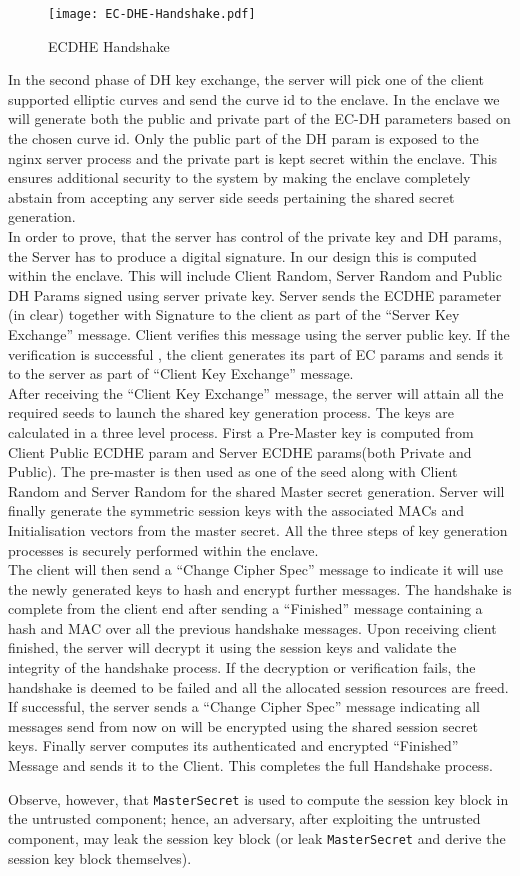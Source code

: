 \documentclass[../../main.tex]{subfiles}
\begin{document}
\begin{figure}[H]
  \centering
  \texttt{[image: EC-DHE-Handshake.pdf]}
  \caption{ECDHE Handshake}
  \label{fig:ecdhe_handshake}
\end{figure}

\noindent
In the second phase of DH key exchange, the server will pick one of
the client supported elliptic curves and send the curve id to the
enclave. In the enclave we will generate both the public and private
part of the EC-DH parameters based on the chosen curve id. Only the
public part of the DH param is exposed to the nginx server process and
the private part is kept secret within the enclave. This ensures
additional security to the system by making the enclave completely
abstain from accepting any server side seeds pertaining the shared
secret generation.\\

\noindent
In order to prove, that the server has control of the private key and
DH params, the Server has to produce a digital signature. In our
design this is computed within the enclave. This will include Client
Random, Server Random and Public DH Params signed using server private
key. Server sends the ECDHE parameter (in clear) together with
Signature to the client as part of the “Server Key Exchange” message.
Client verifies this message using the server public key. If the
verification is successful , the client generates its part of EC
params and sends it to the server as part of “Client Key Exchange”
message.\\

\noindent
After receiving the “Client Key Exchange” message, the server will
attain all the required seeds to launch the shared key generation
process. The keys are calculated in a three level process. First a
Pre-Master key is computed from Client Public ECDHE param and Server
ECDHE params(both Private and Public). The pre-master is then used as
one of the seed along with Client Random and Server Random for the
shared Master secret generation. Server will finally generate the
symmetric session keys with the associated MACs and Initialisation
vectors from the master secret. All the three steps of key
generation processes is securely performed within the enclave.\\

\noindent
The client will then send a “Change Cipher Spec” message to indicate
it will use the newly generated keys to hash and encrypt further
messages. The handshake is complete from the client end after sending
a “Finished” message containing a hash and MAC over all the previous
handshake messages. Upon receiving client finished, the server will
decrypt it using the session keys and validate the integrity of the
handshake process. If the decryption or verification fails, the
handshake is deemed to be failed and all the allocated session
resources are freed. If successful, the server sends a “Change Cipher
Spec” message indicating all messages send from now on will be
encrypted using the shared session secret keys. Finally server
computes its authenticated and encrypted “Finished” Message and sends
it to the Client. This completes the full Handshake process.

Observe, however, that \texttt{MasterSecret} is used to compute the
session key block in the untrusted component; hence, an adversary,
after exploiting the untrusted component, may leak the session key
block (or leak \texttt{MasterSecret} and derive the session key block
themselves).
\end{document}
